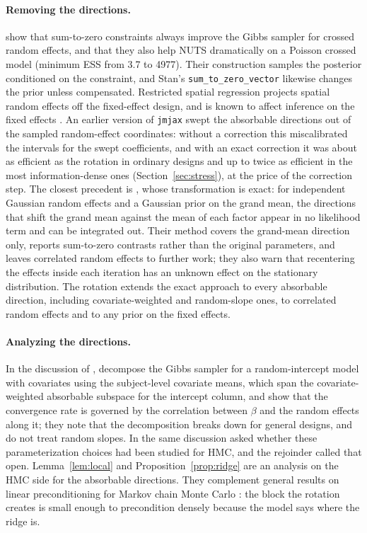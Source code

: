 \paragraph{Removing the directions.} \citet{zanella2021} show that
sum-to-zero constraints always improve the Gibbs sampler for crossed
random effects, and that they also help NUTS dramatically on a Poisson
crossed model (minimum ESS from 3.7 to 4977). Their construction samples
the posterior conditioned on the constraint, and Stan's
\texttt{sum\_to\_zero\_vector} likewise changes the prior unless
compensated. Restricted spatial regression \citep{reich2006,hughes2013}
projects spatial random effects off the fixed-effect design, and is known
to affect inference on the fixed effects
\citep{hodges2010,hanks2015,khan2022}. An earlier version of
\texttt{jmjax} swept the absorbable directions out of the sampled
random-effect coordinates: without a correction this miscalibrated the
intervals for the swept coefficients, and with an exact correction it was
about as efficient as the rotation in ordinary designs and up to twice as
efficient in the most information-dense ones (Section~\ref{sec:stress}),
at the price of the correction step.
The closest precedent is \citet{vines1996}, whose transformation is exact:
for independent Gaussian random effects and a Gaussian prior on the grand
mean, the directions that shift the grand mean against the mean of each
factor appear in no likelihood term and can be integrated out. Their
method covers the grand-mean direction only, reports sum-to-zero contrasts
rather than the original parameters, and leaves correlated random effects
to further work; they also warn that recentering the effects inside each
iteration has an unknown effect on the stationary distribution. The
rotation extends the exact approach to every absorbable direction,
including covariate-weighted and random-slope ones, to correlated random
effects and to any prior on the fixed effects.

\paragraph{Analyzing the directions.} In the discussion of
\citet{zanella2021}, \citet{yang2021} decompose the Gibbs sampler for a
random-intercept model with covariates using the subject-level covariate
means, which span the covariate-weighted absorbable subspace for the
intercept column, and show that the convergence rate is governed by the
correlation between $\beta$ and the random effects along it; they note
that the decomposition breaks down for general designs, and do not treat
random slopes. In the same discussion \citet{robert2021} asked whether
these parameterization choices had been studied for HMC, and the
rejoinder \citep{zanella2021} called that open. Lemma~\ref{lem:local} and
Proposition~\ref{prop:ridge} are an analysis on the HMC side for the
absorbable directions. They complement general results on linear
preconditioning for Markov chain Monte Carlo \citep{hirdlivingstone2025}: the block the
rotation creates is small enough to precondition densely because the model
says where the ridge is.

